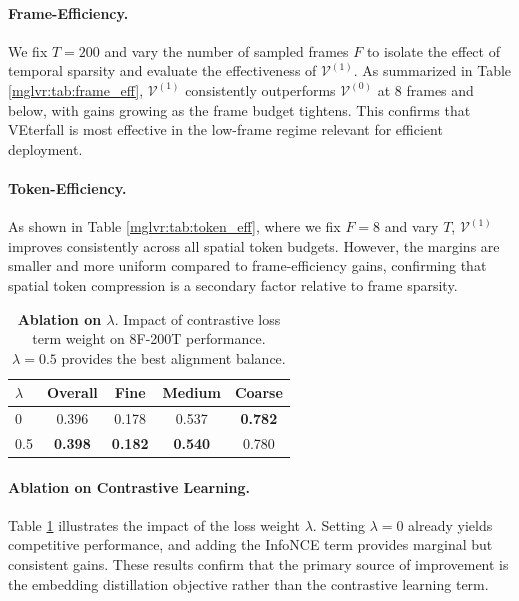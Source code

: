 \paragraph{Frame-Efficiency.}
We fix $T{=}200$ and vary the number of sampled frames $F$ to isolate the effect of temporal sparsity and evaluate the effectiveness of $\mathcal{V}^{(1)}$. As summarized in Table \ref{mglvr:tab:frame_eff}, $\mathcal{V}^{(1)}$ consistently outperforms $\mathcal{V}^{(0)}$ at 8 frames and below, with gains growing as the frame budget tightens. This confirms that VEterfall is most effective in the low-frame regime relevant for efficient deployment.

\paragraph{Token-Efficiency.}
As shown in Table \ref{mglvr:tab:token_eff}, where we fix $F{=}8$ and vary $T$, $\mathcal{V}^{(1)}$ improves consistently across all spatial token budgets. However, the margins are smaller and more uniform compared to frame-efficiency gains, confirming that spatial token compression is a secondary factor relative to frame sparsity.

\begin{table}[t]
    \centering
    \caption{\textbf{Ablation on $\lambda$}. Impact of contrastive loss term weight on 8F-200T performance. $\lambda=0.5$ provides the best alignment balance.}
    \label{mglvr:tab:lambda}
    \begin{tabular}{@{}l*{4}{c}@{}}
        \toprule
        $\lambda$ & Overall & Fine & Medium & Coarse \\
        \midrule
        0   & 0.396 & 0.178 & 0.537 & \textbf{0.782} \\
        0.5 & \textbf{0.398} & \textbf{0.182} & \textbf{0.540} & 0.780 \\
        \bottomrule
    \end{tabular}
\end{table}

\paragraph{Ablation on Contrastive Learning.}
Table \ref{mglvr:tab:lambda} illustrates the impact of the loss weight $\lambda$. Setting $\lambda{=}0$ already yields competitive performance, and adding the InfoNCE term provides marginal but consistent gains. These results confirm that the primary source of improvement is the embedding distillation objective rather than the contrastive learning term.

